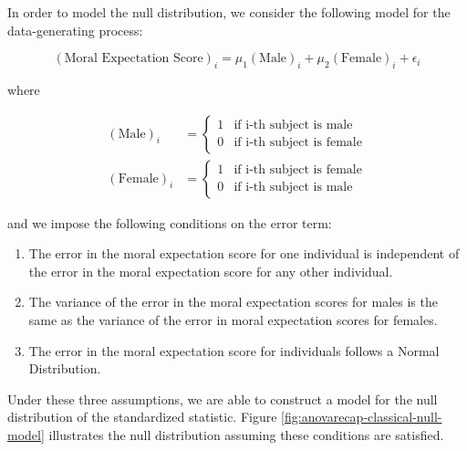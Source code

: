 \documentclass[
]{book}
\providecommand{\tightlist}{%
  \setlength{\itemsep}{0pt}\setlength{\parskip}{0pt}}
\theoremstyle{plain}
\theoremstyle{mydefn}
\theoremstyle{myexmpl}
\theoremstyle{remark}
\begin{document}
In order to model the null distribution, we consider the following model for the data-generating process:

\begin{equation}
  (\text{Moral Expectation Score})_i = \mu_1(\text{Male})_i + \mu_2 (\text{Female})_i + \epsilon_i
  \label{eq:anovarecap-model}
\end{equation}

where

\[
\begin{aligned}
  (\text{Male})_i &= \begin{cases}
    1 & \text{if i-th subject is male} \\
    0 & \text{if i-th subject is female} 
    \end{cases} \\
  (\text{Female})_i &= \begin{cases}
    1 & \text{if i-th subject is female} \\
    0 & \text{if i-th subject is male}
    \end{cases}
\end{aligned}
\]

and we impose the following conditions on the error term:

\begin{enumerate}
\def\labelenumi{\arabic{enumi}.}
\tightlist
\item
  The error in the moral expectation score for one individual is independent of the error in the moral expectation score for any other individual.
\item
  The variance of the error in the moral expectation scores for males is the same as the variance of the error in moral expectation scores for females.
\item
  The error in the moral expectation score for individuals follows a Normal Distribution.
\end{enumerate}

Under these three assumptions, we are able to construct a model for the null distribution of the standardized statistic. Figure \ref{fig:anovarecap-classical-null-model} illustrates the null distribution assuming these conditions are satisfied.
\end{document}
